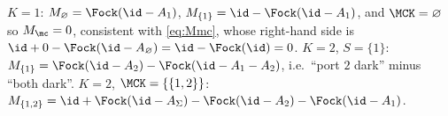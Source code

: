 
\begin{remark}\label{rem:small-k}
$K=1$: $M_\varnothing=\Fock(\id-A_1)$, $M_{\{1\}}=\id-\Fock(\id-A_1)$, and
$\MCK=\varnothing$ so $M_{\mc}=0$, consistent with \eqref{eq:Mmc}, whose
right-hand side is $\id+0-\Fock(\id-A_\varnothing)=\id-\Fock(\id)=0$.
$K=2$, $S=\{1\}$: $M_{\{1\}}=\Fock(\id-A_2)-\Fock(\id-A_1-A_2)$, i.e.\ ``port
$2$ dark'' minus ``both dark''. $K=2$, $\MCK=\{\{1,2\}\}$:
$M_{\{1,2\}}=\id+\Fock(\id-A_\Sigma)-\Fock(\id-A_2)-\Fock(\id-A_1)$.
\end{remark}
